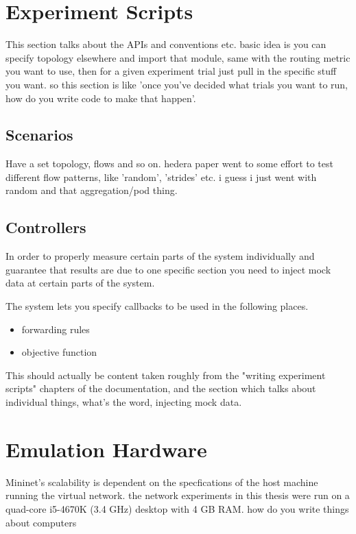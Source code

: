 \section{Experiment Scripts}
This section talks about the APIs and conventions etc. basic idea is you can specify topology elsewhere and import that module, same with the routing metric you want to use, then for a given experiment trial just pull in the specific stuff you want. so this section is like 'once you've decided what trials you want to run, how do you write code to make that happen'.

\subsection{Scenarios}
Have a set topology, flows and so on. hedera paper went to some effort to test different flow patterns, like 'random', 'strides' etc. i guess i just went with random and that aggregation/pod thing. 

\subsection{Controllers}
In order to properly measure certain parts of the system individually and guarantee that results are due to one specific section you need to inject mock data at certain parts of the system.

The system lets you specify callbacks to be used in the following places.

\begin{itemize}
\item forwarding rules
\item objective function
\end{itemize}

This should actually be content taken roughly from the "writing experiment scripts" chapters of the documentation, and the section which talks about individual things, what's the word, injecting mock data.

\section{Emulation Hardware}

Mininet's scalability is dependent on the specfications of the host machine running the virtual network. the network experiments in this thesis were run on a quad-core i5-4670K (3.4 GHz) desktop with 4 GB RAM. how do you write things about computers
